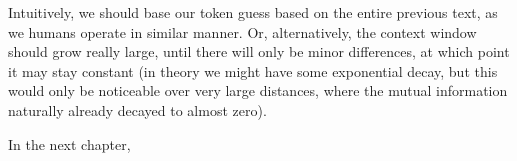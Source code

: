 \documentclass[../../main.tex]{subfiles}
\begin{document}
    Intuitively, we should base our token guess based on the entire previous text, as we humans operate in similar manner. Or, alternatively, the context window should grow really large, until there will only be minor differences, at which point it may stay constant (in theory we might have some exponential decay, but this would only be noticeable over very large distances, where the mutual information naturally already decayed to almost zero).

    In the next chapter, 
\end{document}
